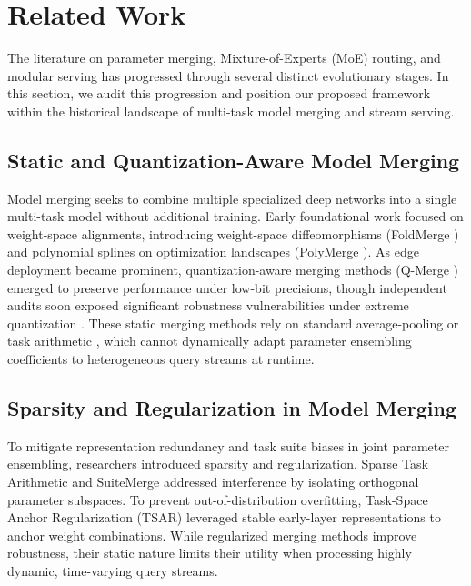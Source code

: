 \section{Related Work}
\label{sec:related_work}

The literature on parameter merging, Mixture-of-Experts (MoE) routing, and modular serving has progressed through several distinct evolutionary stages. In this section, we audit this progression and position our proposed framework within the historical landscape of multi-task model merging and stream serving.

\subsection{Static and Quantization-Aware Model Merging}
Model merging seeks to combine multiple specialized deep networks into a single multi-task model without additional training. Early foundational work focused on weight-space alignments, introducing weight-space diffeomorphisms (FoldMerge \cite{foldmerge_2024}) and polynomial splines on optimization landscapes (PolyMerge \cite{polymerge_2024}). As edge deployment became prominent, quantization-aware merging methods (Q-Merge \cite{qmerge_2024}) emerged to preserve performance under low-bit precisions, though independent audits soon exposed significant robustness vulnerabilities under extreme quantization \cite{qmerge_audit_2025}. These static merging methods rely on standard average-pooling or task arithmetic \cite{task_arithmetic_ilharco, wortsman2022model, merge_ties, merge_dare}, which cannot dynamically adapt parameter ensembling coefficients to heterogeneous query streams at runtime.

\subsection{Sparsity and Regularization in Model Merging}
To mitigate representation redundancy and task suite biases in joint parameter ensembling, researchers introduced sparsity and regularization. Sparse Task Arithmetic \cite{sparse_task_arithmetic_2025} and SuiteMerge \cite{suitemerge_2025} addressed interference by isolating orthogonal parameter subspaces. To prevent out-of-distribution overfitting, Task-Space Anchor Regularization (TSAR) \cite{tsar_2025} leveraged stable early-layer representations to anchor weight combinations. While regularized merging methods improve robustness, their static nature limits their utility when processing highly dynamic, time-varying query streams.

